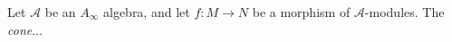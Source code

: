 
 
 
Let $\mathcal A$ be an $A_\infty$ algebra, and let $f:M\to N$ be a morphism of $\mathcal A$-modules. The \emph{cone}...


 